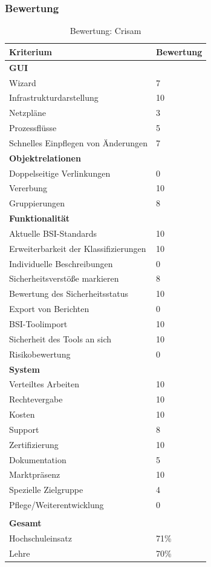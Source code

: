 \subsubsection{Bewertung}
\begin{table}[h]
\begin{tabular}{|p{}|p{}|}
\hline 
Kriterium & Bewertung \\ 
\hline 
\textbf{GUI}& \\
\hline
Wizard & 7 \\
\hline 
Infrastrukturdarstellung & 10 \\
\hline 
Netzpläne & 3 \\
\hline 
Prozessflüsse & 5 \\
\hline 
Schnelles Einpflegen von Änderungen & 7 \\
\hline
\textbf{Objektrelationen} & \\
\hline 
Doppelseitige Verlinkungen & 0 \\
\hline 
Vererbung & 10 \\
\hline 
Gruppierungen & 8 \\
\hline 
\textbf{Funktionalität} & \\
\hline 
Aktuelle BSI-Standards & 10  \\
\hline  
Erweiterbarkeit der Klassifizierungen & 10 \\
\hline 
Individuelle Beschreibungen & 0 \\
\hline 
Sicherheitsverstöße markieren & 8  \\
\hline
Bewertung des Sicherheitsstatus & 10 \\
\hline
Export von Berichten & 0  \\
\hline
BSI-Toolimport & 10 \\
\hline
Sicherheit des Tools an sich & 10 \\
\hline
Risikobewertung & 0 \\
\hline
\textbf{System}&\\
\hline
Verteiltes Arbeiten & 10\\
\hline
Rechtevergabe & 10 \\
\hline
Kosten & 10 \\
\hline
Support & 8  \\
\hline
Zertifizierung & 10 \\
\hline
Dokumentation & 5  \\
\hline
Marktpräsenz & 10  \\
\hline
Spezielle Zielgruppe & 4  \\
\hline
Pflege/Weiterentwicklung & 0 \\
\hline
\multicolumn{2}{c}{}\\
\hline
\textbf{Gesamt} & \\
\hline
Hochschuleinsatz & 71\%\\
\hline
Lehre & 70\%\\
\hline

\end{tabular} 
\caption{Bewertung: Crisam}
\label{tab:Berwertung Crisam}
\end{table}
